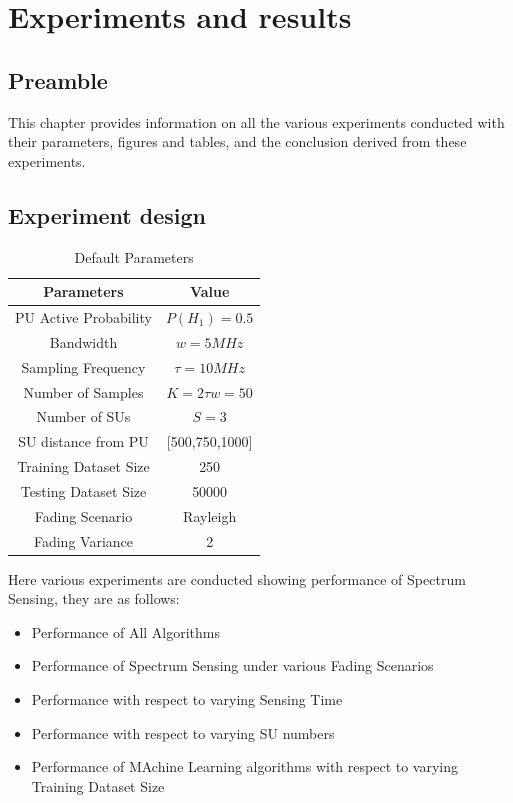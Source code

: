 \chapter{Experiments and results}

\section{Preamble}
This chapter provides information on all the various experiments conducted with their parameters, figures and tables, and the conclusion derived from these experiments. 

\section{Experiment design}

\begin{table}
\centering
\caption{Default Parameters}
    \begin{tabular}{||c c||}
    \hline
    {\bf Parameters}     & {\bf Value} \\ \hline

  	PU Active Probability 	& $P(H_1)=0.5$	\\ \hline
  	Bandwidth 			& $w=5  MHz$	\\ \hline
  	Sampling Frequency 	& $\tau=10MHz	$	\\ \hline
  	Number of Samples	& $K=2\tau w= 50$		\\ \hline
  	Number of SUs 		& $S=3$		\\ \hline
	SU distance from PU  	& [500,750,1000]	\\ \hline
  	Training Dataset Size 	& 250		\\ \hline
  	Testing Dataset Size 	& 50000		\\ \hline
  	Fading Scenario		& Rayleigh		\\ \hline
	Fading Variance		& 2			\\ \hline
    \end{tabular}
\end{table} 


Here various experiments are conducted showing performance of Spectrum Sensing, they are as follows:
\begin{itemize}
\item Performance of All Algorithms
\item Performance of Spectrum Sensing under various Fading Scenarios
\item Performance with respect to varying Sensing Time
\item Performance with respect to varying SU numbers
\item Performance of MAchine Learning algorithms with respect to varying Training Dataset Size \\
\end{itemize}






